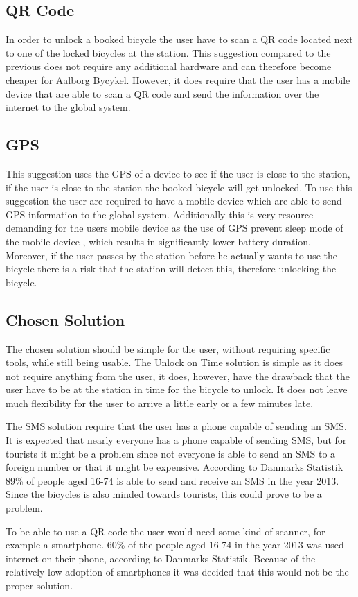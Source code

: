 \subsection{QR Code}
In order to unlock a booked bicycle the user have to scan a QR code located next to one of the locked bicycles at the station.
This suggestion compared to the previous does not require any additional hardware and can therefore become cheaper for Aalborg Bycykel.
However, it does require that the user has a mobile device that are able to scan a QR code and send the information over the internet to the global system.

\subsection{GPS}
This suggestion uses the GPS of a device to see if the user is close to the station, if the user is close to the station the booked bicycle will get unlocked.
To use this suggestion the user are required to have a mobile device which are able to send GPS information to the global system.
Additionally this is very resource demanding for the users mobile device as the use of GPS prevent sleep mode of the mobile device \citep{misc:gpsbatteryusage}, which results in significantly lower battery duration.
Moreover, if the user passes by the station before he actually wants to use the bicycle there is a risk that the station will detect this, therefore unlocking the bicycle.

\subsection{Chosen Solution}
The chosen solution should be simple for the user, without requiring specific tools, while still being usable.
The Unlock on Time solution is simple as it does not require anything from the user, it does, however, have the drawback that the user have to be at the station in time for the bicycle to unlock.
It does not leave much flexibility for the user to arrive a little early or a few minutes late.

The SMS solution require that the user has a phone capable of sending an SMS. 
It is expected that nearly everyone has a phone capable of sending SMS, but for tourists it might be a problem since not everyone is able to send an SMS to a foreign number or that it might be expensive.
According to Danmarks Statistik 89\% of people aged 16-74 is able to send and receive an SMS in the year 2013\citep{misc:dstMobilephone}.
Since the bicycles is also minded towards tourists, this could prove to be a problem.

To be able to use a QR code the user would need some kind of scanner, for example a smartphone.
60\% of the people aged 16-74 in the year 2013 was used internet on their phone, according to Danmarks Statistik\citep{misc:dstMobilephone}.
Because of the relatively low adoption of smartphones it was decided that this would not be the proper solution.

